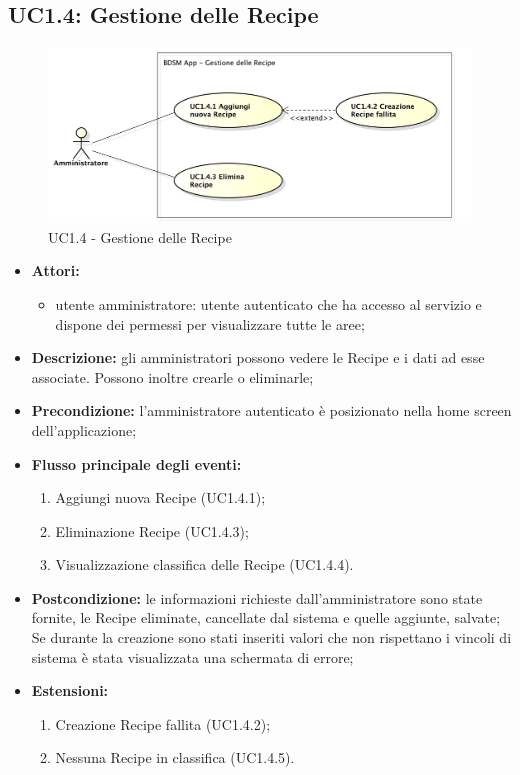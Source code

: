 \pagebreak


\subsection{UC1.4: Gestione delle Recipe}
\begin{figure}[!ht]
	\centering
	\centerline{\includegraphics[scale=0.45]{./images/UC1_4.pdf}}
	\caption{UC1.4 - Gestione delle Recipe}
\end{figure}

\begin{itemize}
	\item \textbf{Attori:}
	\begin{itemize}
		\item utente amministratore: utente autenticato che ha accesso al servizio e dispone dei permessi per visualizzare tutte le aree;
	\end{itemize}
	\item \textbf{Descrizione:} gli amministratori possono vedere le Recipe e i dati ad esse associate. Possono inoltre crearle o eliminarle;
	\item \textbf{Precondizione:} l'amministratore autenticato è posizionato nella home screen dell'applicazione;
	\item \textbf{Flusso principale degli eventi:}
	\begin{enumerate}
		\item Aggiungi nuova Recipe (UC1.4.1);
		\item Eliminazione Recipe (UC1.4.3);
		\item Visualizzazione classifica delle Recipe (UC1.4.4).
	\end{enumerate}
	\item \textbf{Postcondizione:} le informazioni richieste dall'amministratore sono state fornite, le Recipe eliminate, cancellate dal sistema e quelle aggiunte, salvate; Se durante la creazione sono stati inseriti valori che non rispettano i vincoli di sistema è stata visualizzata una schermata di errore;
	\item \textbf{Estensioni:}
		\begin{enumerate}
			\item Creazione Recipe fallita (UC1.4.2);
			\item Nessuna Recipe in classifica (UC1.4.5).
		\end{enumerate}
\end{itemize}

